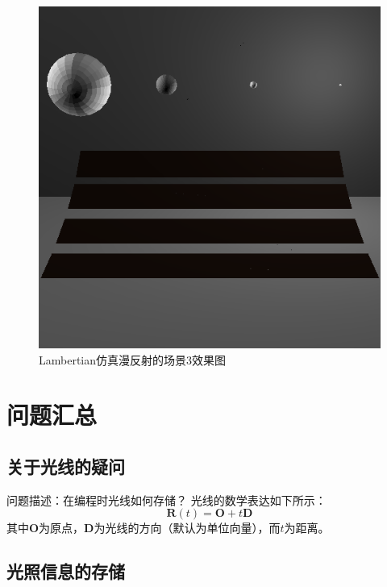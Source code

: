 \documentclass[10pt]{article}
\begin{document}
\begin{figure}[H]
\begin{center}
\includegraphics[scale=0.5]{result3.png}
\end{center}
\caption{Lambertian仿真漫反射的场景3效果图}
\end{figure}

\section{问题汇总}
\subsection{关于光线的疑问}
问题描述：在编程时光线如何存储？
光线的数学表达如下所示：
$$\bm{R}(t)=\bm{O}+t\bm{D}$$
其中$\bm{O}$为原点，$\bm{D}$为光线的方向（默认为单位向量），而$t$为距离。
\subsection{光照信息的存储}
\end{document}
